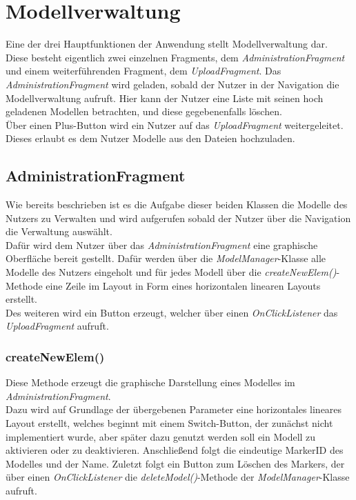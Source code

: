 \section{Modellverwaltung}\label{impl:verwaltung}
Eine der drei Hauptfunktionen der Anwendung stellt Modellverwaltung dar. Diese besteht eigentlich zwei einzelnen Fragments, dem \textit{AdministrationFragment} und einem weiterführenden Fragment, dem \textit{UploadFragment}. Das \textit{AdministrationFragment} wird geladen, sobald der Nutzer in der Navigation die Modellverwaltung aufruft. Hier kann der Nutzer eine Liste mit seinen hoch geladenen Modellen betrachten, und diese gegebenenfalls löschen. \\
Über einen Plus-Button wird ein Nutzer auf das \textit{UploadFragment} weitergeleitet. Dieses erlaubt es dem Nutzer Modelle aus den Dateien hochzuladen. 

\subsection{AdministrationFragment}
Wie bereits beschrieben ist es die Aufgabe dieser beiden Klassen die Modelle des Nutzers zu Verwalten und wird aufgerufen sobald der Nutzer über die Navigation die Verwaltung auswählt. \\
Dafür wird dem Nutzer über das \textit{AdministrationFragment} eine graphische Oberfläche bereit gestellt. Dafür werden über die \textit{ModelManager}-Klasse alle Modelle des Nutzers eingeholt und für jedes Modell über die \textit{createNewElem()}-Methode eine Zeile im Layout in Form eines horizontalen linearen Layouts erstellt.\\
Des weiteren wird ein Button erzeugt, welcher über einen \textit{OnClickListener} das \textit{UploadFragment} aufruft.

\subsubsection{createNewElem()}
Diese Methode erzeugt die graphische Darstellung eines Modelles im \textit{AdministrationFragment}.\\
Dazu wird auf Grundlage der übergebenen Parameter eine horizontales lineares Layout erstellt, welches beginnt mit einem Switch-Button, der zunächst nicht implementiert wurde, aber später dazu genutzt werden soll ein Modell zu aktivieren oder zu deaktivieren. Anschließend folgt die eindeutige MarkerID des Modelles und der Name. Zuletzt folgt ein Button zum Löschen des Markers, der über einen \textit{OnClickListener} die \textit{deleteModel()}-Methode der \textit{ModelManager}-Klasse aufruft.

